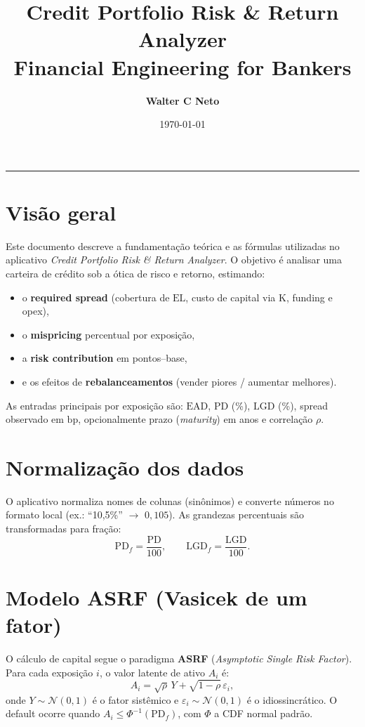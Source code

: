 \documentclass[11pt,a4paper]{article}
\title{\textbf{Credit Portfolio Risk \& Return Analyzer}\\[2mm]
\large \textcolor{safraBlue}{Financial Engineering for Bankers}}
\author{\textbf{Walter C Neto}}
\date{\today}
\newcommand{\PD}{\mathrm{PD}}
\newcommand{\LGD}{\mathrm{LGD}}
\newcommand{\EAD}{\mathrm{EAD}}
\newcommand{\EL}{\mathrm{EL}}
\newcommand{\Kcap}{\mathrm{K}}
\newcommand{\Rho}{\rho}
\newcommand{\bp}{\mathrm{bp}}
\begin{document}
\maketitle
\vspace{-1.0em}
\hrule
\vspace{1.2em}

\section{Visão geral}
Este documento descreve a fundamentação teórica e as fórmulas utilizadas no aplicativo \emph{Credit Portfolio Risk \& Return Analyzer}. O objetivo é analisar uma carteira de crédito sob a ótica de risco e retorno, estimando:
\begin{itemize}[leftmargin=1.2em]
  \item o \textbf{required spread} (cobertura de \(\EL\), custo de capital via \(\Kcap\), funding e opex),
  \item o \textbf{mispricing} percentual por exposição,
  \item a \textbf{risk contribution} em pontos--base,
  \item e os efeitos de \textbf{rebalanceamentos} (vender piores / aumentar melhores).
\end{itemize}

As entradas principais por exposição são: \(\EAD\), \(\PD\) (\%), \(\LGD\) (\%), spread observado em \(\bp\), opcionalmente prazo (\emph{maturity}) em anos e correlação \(\Rho\).

\section{Normalização dos dados}
O aplicativo normaliza nomes de colunas (sinônimos) e converte números no formato local (ex.: ``10,5\%'' \(\rightarrow\) \(0{,}105\)). As grandezas percentuais são transformadas para fração:
\begin{equation}
\PD_f = \frac{\PD}{100}, \qquad \LGD_f = \frac{\LGD}{100}.
\end{equation}

\section{Modelo ASRF (Vasicek de um fator)}
O cálculo de capital segue o paradigma \textbf{ASRF} (\emph{Asymptotic Single Risk Factor}). Para cada exposição \(i\), o valor latente de ativo \(A_i\) é:
\begin{equation}
A_i = \sqrt{\Rho}\,Y + \sqrt{1-\Rho}\,\varepsilon_i,
\end{equation}
onde \(Y \sim \mathcal{N}(0,1)\) é o fator sistêmico e \(\varepsilon_i \sim \mathcal{N}(0,1)\) é o idiossincrático. O default ocorre quando \(A_i \leq \Phi^{-1}(\PD_f)\), com \(\Phi\) a CDF normal padrão.
\end{document}
